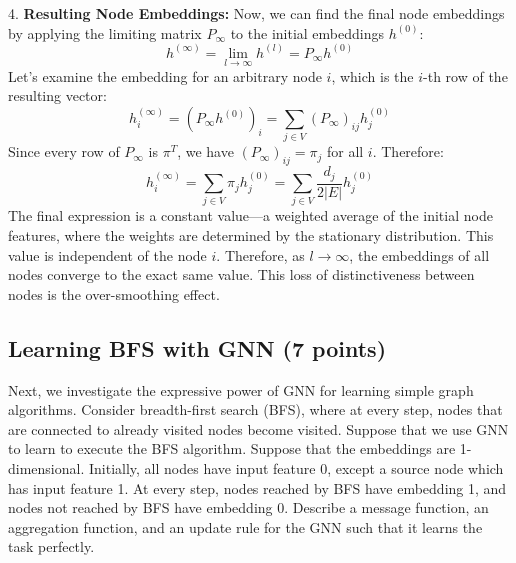 \documentclass{article}
\numberwithin{figure}{section}
\begin{document}
{		4.  \textbf{Resulting Node Embeddings:}
		Now, we can find the final node embeddings by applying the limiting matrix $P_\infty$ to the initial embeddings $h^{(0)}$:
		\[ h^{(\infty)} = \lim_{l\to\infty} h^{(l)} = P_\infty h^{(0)} \]
		Let's examine the embedding for an arbitrary node $i$, which is the $i$-th row of the resulting vector:
		\[ h^{(\infty)}_i = (P_\infty h^{(0)})_i = \sum_{j \in V} (P_\infty)_{ij} h^{(0)}_j \]
		Since every row of $P_\infty$ is $\pi^T$, we have $(P_\infty)_{ij} = \pi_j$ for all $i$. Therefore:
		\[ h^{(\infty)}_i = \sum_{j \in V} \pi_j h^{(0)}_j = \sum_{j \in V} \frac{d_j}{2|E|} h^{(0)}_j \]
		The final expression is a constant value—a weighted average of the initial node features, where the weights are determined by the stationary distribution. This value is independent of the node $i$. Therefore, as $l \rightarrow \infty$, the embeddings of all nodes converge to the exact same value. This loss of distinctiveness between nodes is the over-smoothing effect.
	}
	
	
	\subsection{Learning BFS with GNN (7 points)}
	
	Next, we investigate the expressive power of GNN for learning simple graph algorithms. Consider breadth-first search (BFS), where at every step, nodes that are connected to already visited nodes become visited. Suppose that we use GNN to learn to execute the BFS algorithm. Suppose that the embeddings are 1-dimensional. Initially, all nodes have input feature 0, except a source node which has input feature 1. At every step, nodes reached by BFS have embedding 1, and nodes not reached by BFS have embedding 0. Describe a message function, an aggregation function, and an update rule for the GNN such that it learns the task perfectly.
	
\end{document}
